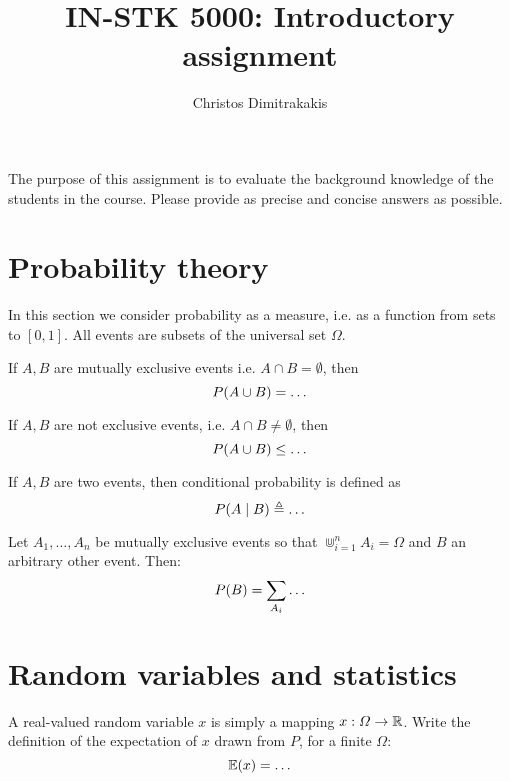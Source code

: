 \documentclass[a4paper]{article}
\title{IN-STK 5000: Introductory assignment}
\author{Christos Dimitrakakis}
\begin{document}
\maketitle
The purpose of this assignment is to evaluate the background knowledge
of the students in the course. Please provide as precise and concise
answers as possible. 

\section{Probability theory}
In this section we consider probability as a measure, i.e. as a function from sets to $[0,1]$. All events are subsets of the universal set $\Omega$.
\begin{exercise}
  If $A, B$ are mutually exclusive events i.e. $A \cap B = \emptyset$,  then 
  \[
  P(A \cup B) =
  \ifdefined \solution
  P(A) + P(B)
  \else
  \ldots
  \fi
  \]
\end{exercise}
\begin{exercise}
  If $A, B$ are not exclusive events, i.e. $A \cap B \neq \emptyset$, then 
  \[
  P(A \cup B) \leq
  \ifdefined \solution
  P(A) + P(B)
  \else
  \ldots
  \fi
  \]
\end{exercise}

\begin{exercise}
  If $A, B$ are two events, then conditional probability is defined as
  \[
  P(A \mid B) \defn 
  \ifdefined \solution
  \frac{P(A \cap B)}{P(B)}
  \else
  \ldots
  \fi
  \]
\end{exercise}

\begin{exercise}
  Let $A_1, \ldots, A_n$ be mutually exclusive events so that $\Cup_{i=1}^n A_i = \Omega$ and $B$ an arbitrary other event. Then:
  \[
  P(B) = \sum_{A_i} 
  \ifdefined \solution
  P(A_i \cap B)
  \else
  \ldots
  \fi
  \]
\end{exercise}

\section{Random variables and statistics}


\begin{exercise}
  A real-valued random variable $x$ is simply a mapping $x : \Omega \to {\mathbb{R}}$.
  Write the definition of the expectation of $x$ drawn from $P$, for a finite $\Omega$:
  \[
  \E(x) = 
  \ifdefined \solution
  \sum_{\omega} x(\omega) P(\omega) 
  \else
  \ldots
  \fi
  \]
\end{exercise}
\end{document}
